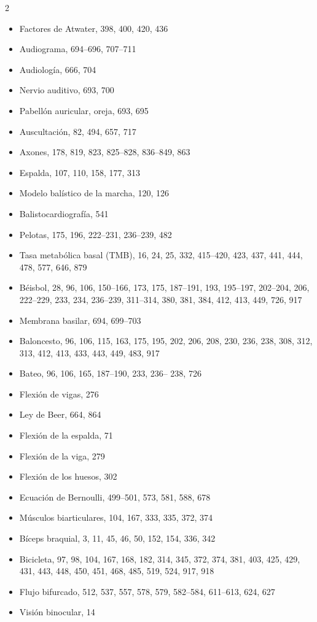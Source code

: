 \documentclass[12pt,a4paper]{book}
\begin{document}
\begin{multicols}{2}
\begin{itemize}[leftmargin=*]
  \item Factores de Atwater, 398, 400, 420, 436
  \item Audiograma, 694--696, 707--711
  \item Audiología, 666, 704
  \item Nervio auditivo, 693, 700
  \item Pabellón auricular, oreja, 693, 695
  \item Auscultación, 82, 494, 657, 717
  \item Axones, 178, 819, 823, 825--828, 836--849, 863
  \item Espalda, 107, 110, 158, 177, 313
  \item Modelo balístico de la marcha, 120, 126
  \item Balistocardiografía, 541
  \item Pelotas, 175, 196, 222--231, 236--239, 482
  \item Tasa metabólica basal (TMB), 16, 24, 25, 332, 415--420, 423, 437, 441, 444, 478, 577, 646, 879
  \item Béisbol, 28, 96, 106, 150--166, 173, 175, 187--191, 193, 195--197, 202--204, 206, 222--229, 233, 234, 236--239, 311--314, 380, 381, 384, 412, 413, 449, 726, 917
  \item Membrana basilar, 694, 699--703
  \item Baloncesto, 96, 106, 115, 163, 175, 195, 202, 206, 208, 230, 236, 238, 308, 312, 313, 412, 413, 433, 443, 449, 483, 917
  \item Bateo, 96, 106, 165, 187--190, 233, 236-- 238, 726
  \item Flexión de vigas, 276
  \item Ley de Beer, 664, 864
  \item Flexión de la espalda, 71
  \item Flexión de la viga, 279
  \item Flexión de los huesos, 302
  \item Ecuación de Bernoulli, 499--501, 573, 581, 588, 678
  \item Músculos biarticulares, 104, 167, 333, 335, 372, 374
  \item Bíceps braquial, 3, 11, 45, 46, 50, 152, 154, 336, 342
  \item Bicicleta, 97, 98, 104, 167, 168, 182, 314, 345, 372, 374, 381, 403, 425, 429, 431, 443, 448, 450, 451, 468, 485, 519, 524, 917, 918
  \item Flujo bifurcado, 512, 537, 557, 578, 579, 582--584, 611--613, 624, 627
  \item Visión binocular, 14

\end{itemize}
\end{multicols}
\end{document}
